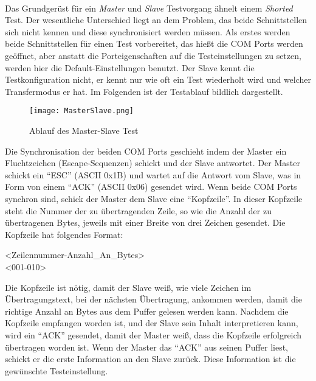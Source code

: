 \paragraph{}
Das Grundgerüst für ein \textit{Master} und \textit{Slave} Testvorgang ähnelt einem \textit{Shorted} Test. Der wesentliche Unterschied liegt an dem Problem, das beide Schnittstellen sich nicht kennen und diese synchronisiert werden müssen. Als erstes werden beide Schnittstellen für einen Test vorbereitet, das hießt die COM Ports werden geöffnet, aber anstatt die Porteigenschaften auf die Testeinstellungen zu setzen, werden hier die Default-Einstellungen benutzt. Der Slave kennt die Testkonfiguration nicht, er kennt nur wie oft ein Test wiederholt wird und welcher Transfermodus er hat. Im Folgenden ist der Testablauf bildlich dargestellt.\\

\begin{figure}[h]
  \begin{center}
    \texttt{[image: MasterSlave.png]}
  		  \caption{Ablauf des Master-Slave Test}
     \label{MasterSlaveDiagramm}
  \end{center}
\end{figure}


\newpage


Die Synchronisation der beiden COM Ports geschieht indem der Master ein Fluchtzeichen (Escape-Sequenzen) schickt und der Slave antwortet. Der Master schickt ein "`ESC"' (ASCII 0x1B) und wartet auf die Antwort vom Slave, was in Form von einem "`ACK"' (ASCII 0x06) gesendet wird. Wenn beide COM Ports synchron sind, schick der Master dem Slave eine "`Kopfzeile"'. In dieser Kopfzeile steht die Nummer der zu übertragenden Zeile, so wie die Anzahl der zu übertragenen Bytes, jeweils mit einer Breite von drei Zeichen gesendet. Die Kopfzeile hat folgendes Format:

\begin{center}
<Zeilennummer-Anzahl\_An\_Bytes>\\

<001-010>
\end{center}

Die Kopfzeile ist nötig, damit der Slave weiß, wie viele Zeichen im Übertragungstext, bei der nächsten Übertragung, ankommen werden, damit die richtige Anzahl an Bytes aus dem Puffer gelesen werden kann. Nachdem die Kopfzeile empfangen worden ist, und der Slave sein Inhalt interpretieren kann, wird ein "`ACK"' gesendet, damit der Master weiß, dass die Kopfzeile erfolgreich übertragen worden ist. Wenn der Master das "`ACK"' aus seinen Puffer liest, schickt er die erste Information an den Slave zurück. Diese Information ist die gewünschte Testeinstellung.

